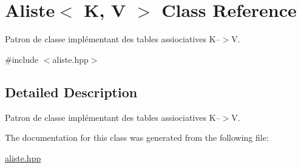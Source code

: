 \hypertarget{class_aliste_3_01_k_00_01_v_01_4}{}\section{Aliste$<$ K, V $>$ Class Reference}
\label{class_aliste_3_01_k_00_01_v_01_4}


Patron de classe implémentant des tables assiociatives K--$>$V.  




{\ttfamily \#include $<$aliste.\+hpp$>$}



\subsection{Detailed Description}
Patron de classe implémentant des tables assiociatives K--$>$V. 

The documentation for this class was generated from the following file\+:\begin{DoxyCompactItemize}
\item 
\hyperlink{aliste_8hpp}{aliste.\+hpp}\end{DoxyCompactItemize}
